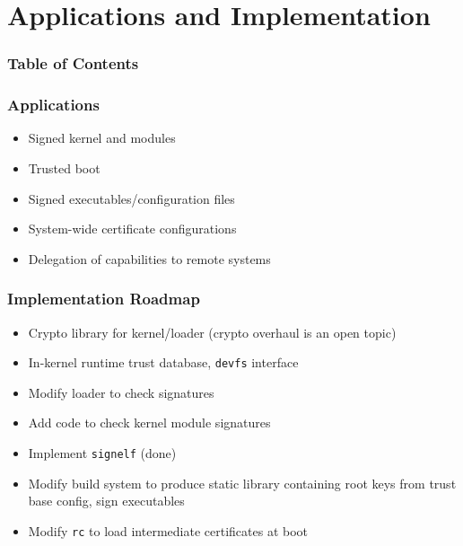 \documentclass{beamer}
\begin{document}
\section{Applications and Implementation}

\begin{frame}
  \frametitle{Table of Contents}
  \tableofcontents[currentsection]
\end{frame}

\begin{frame}
  \frametitle{Applications}
  \begin{itemize}
  \item Signed kernel and modules
  \item Trusted boot
  \item Signed executables/configuration files
  \item System-wide certificate configurations
  \item Delegation of capabilities to remote systems
  \end{itemize}
\end{frame}

\begin{frame}
  \frametitle{Implementation Roadmap}
  \begin{itemize}
  \item Crypto library for kernel/loader (crypto overhaul is an open
    topic)
  \item In-kernel runtime trust database, \texttt{devfs} interface
  \item Modify loader to check signatures
  \item Add code to check kernel module signatures
  \item Implement \texttt{signelf} (done)
  \item Modify build system to produce static library containing root
    keys from trust base config, sign executables
  \item Modify \texttt{rc} to load intermediate certificates at boot
  \end{itemize}
\end{frame}
\end{document}
